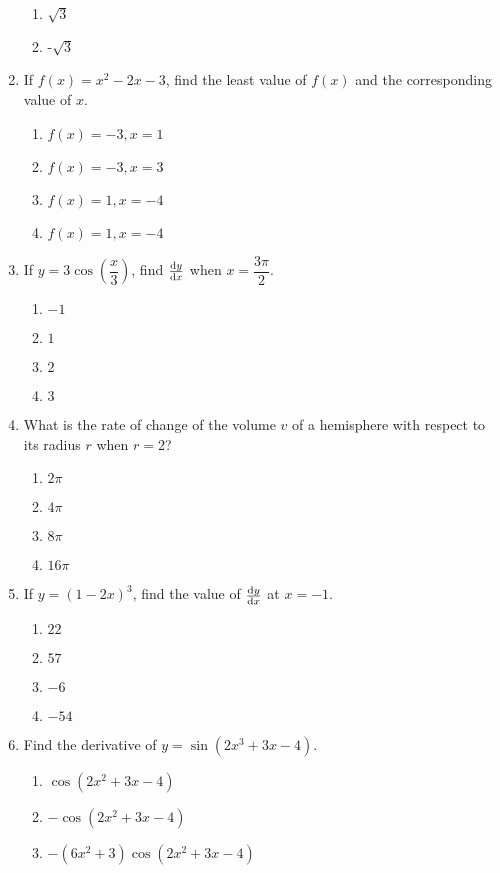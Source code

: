 \begin{multicols}{2}
\begin{enumerate}[label={\arabic*.}]
\begin{enumerate}[label={\Alph*.}]
		\item \(\sqrt{3}\)
		\item -\(\sqrt{3}\)
	\end{enumerate}
\item If \(f(x) = {x}^{2} - 2x - 3\), find the least value of \(f(x)\) and the corresponding value of \(x\).
	\begin{enumerate}[label={\Alph*.}]
		\item \(f(x) = -3, x = 1\)
		\item \(f(x) = -3, x = 3\)
		\item \(f(x) = 1, x = -4\)
		\item \(f(x) = 1, x = -4\)
	\end{enumerate}
\item If \(y = 3 \cos\left(\dfrac{x}{3}\right)\), find \(\dv{y}{x}\) when \(x = \dfrac{3\pi}{2}\).
	\begin{enumerate}[label={\Alph*.}]
		\item \(-1\)
		\item \(1\)
		\item \(2\)
		\item  \(3\)
	\end{enumerate}
\item What is the rate of change of the volume \(v\) of a hemisphere with respect to its radius \(r\) when \(r = 2\)?
	\begin{enumerate}[label={\Alph*.}]
		\item  \(2\pi\)
		\item  \(4\pi\)
		\item  \(8\pi\)
		\item  \(16\pi\)
	\end{enumerate}
\item If \(y = (1-2x)^3\), find the value of \(\dv{y}{x}\) at \(x = -1\).
		\begin{enumerate}[label={\Alph*.}]
		\item \(22\)
		\item \(57\)
		\item \(-6\)
		\item \(-54\)
	\end{enumerate}
\item Find the derivative of \(y = \sin(2{x}^{3}+3x-4)\).
	\begin{enumerate}[label={\Alph*.}]
		\item \(\cos(2{x}^{2}+3x-4)\)
		\item \(-\cos(2{x}^{2}+3x-4)\)
		\item \(-(6{x}^{2}+3)\cos(2{x}^{2}+3x-4)\)

\end{enumerate}
\end{enumerate}
\end{multicols}
